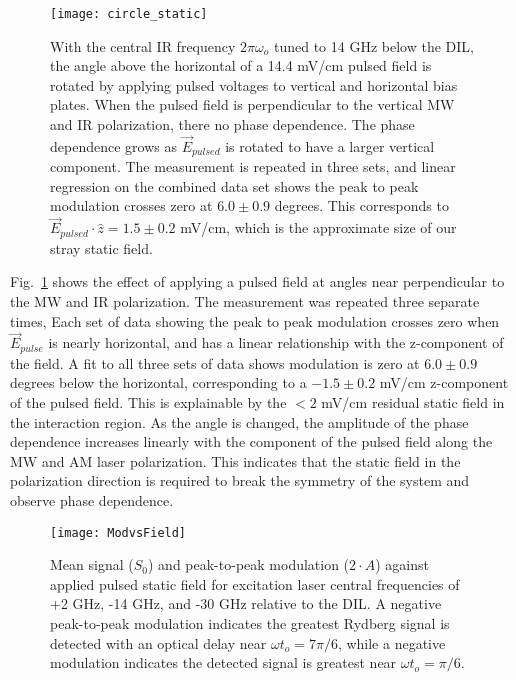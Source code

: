 \documentclass[aps,pra,preprint,groupedaddress]{revtex4-1}
\begin{document}
\begin{figure}
	\texttt{[image: circle\_static]}
	\caption{With the central IR frequency $2\pi\omega_o$ tuned to 14 GHz below the DIL, the angle above the horizontal of a 14.4 mV/cm pulsed field is rotated by applying pulsed voltages to vertical and horizontal bias plates. When the pulsed field is perpendicular to the vertical MW and IR polarization, there no phase dependence. The phase dependence grows as $\vec{E}_{pulsed}$ is rotated to have a larger vertical component. The measurement is repeated in three sets, and linear regression on the combined data set shows the peak to peak modulation crosses zero at $6.0 \pm 0.9$ degrees. This corresponds to $\vec{E}_{pulsed} \cdot \hat{z} = 1.5 \pm 0.2$ mV/cm, which is the approximate size of our stray static field.}
	\label{fig:CircleStatic}
\end{figure}

Fig.~\ref{fig:CircleStatic} shows the effect of applying a pulsed field at angles near perpendicular to the MW and IR polarization. The measurement was repeated three separate times, Each set of data showing the peak to peak modulation crosses zero when $\vec{E}_{pulse}$ is nearly horizontal, and has a linear relationship with the z-component of the field. A fit to all three sets of data shows modulation is zero at $6.0 \pm 0.9$ degrees below the horizontal, corresponding to a $-1.5 \pm 0.2$ mV/cm z-component of the pulsed field. This is explainable by the $<2$ mV/cm residual static field in the interaction region. As the angle is changed, the amplitude of the phase dependence increases linearly with the component of the pulsed field along the MW and AM laser polarization. This indicates that the static field in the polarization direction is required to break the symmetry of the system and observe phase dependence.

\begin{figure}
	\texttt{[image: ModvsField]}
	\caption{Mean signal ($S_0$) and peak-to-peak modulation ($2\cdot A$) against applied pulsed static field for excitation laser central frequencies of +2 GHz, -14 GHz, and -30 GHz relative to the DIL. A negative peak-to-peak modulation indicates the greatest Rydberg signal is detected with an optical delay near $\omega t_o = 7\pi/6$, while a negative modulation indicates the detected signal is greatest near $\omega t_o = \pi/6$.}
	\label{fig:ModvsField}
\end{figure}
\end{document}

